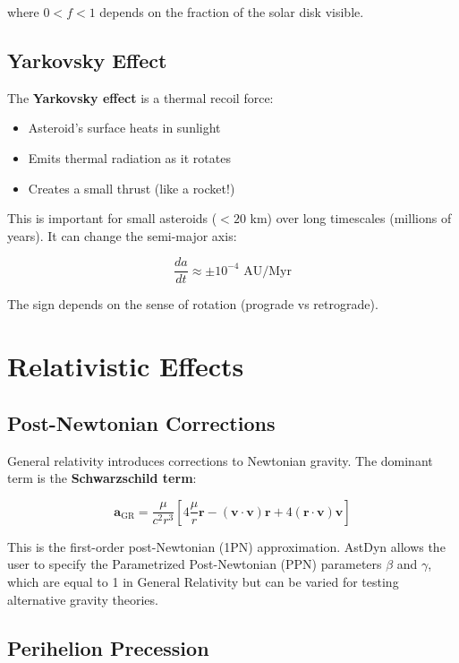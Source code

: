 where $0 < f < 1$ depends on the fraction of the solar disk visible.

\subsection{Yarkovsky Effect}

The \textbf{Yarkovsky effect} is a thermal recoil force:
\begin{itemize}
    \item Asteroid's surface heats in sunlight
    \item Emits thermal radiation as it rotates
    \item Creates a small thrust (like a rocket!)
\end{itemize}

This is important for small asteroids ($< 20$ km) over long timescales (millions of years). It can change the semi-major axis:

\begin{equation}
    \frac{da}{dt} \approx \pm 10^{-4} \text{ AU/Myr}
\end{equation}

The sign depends on the sense of rotation (prograde vs retrograde).

\section{Relativistic Effects}

\subsection{Post-Newtonian Corrections}

General relativity introduces corrections to Newtonian gravity. The dominant term is the \textbf{Schwarzschild term}:

\begin{equation}
    \mathbf{a}_{\text{GR}} = \frac{\mu}{c^2 r^3}\left[4\frac{\mu}{r}\mathbf{r} - (\mathbf{v} \cdot \mathbf{v})\mathbf{r} + 4(\mathbf{r} \cdot \mathbf{v})\mathbf{v}\right]
\end{equation}

This is the first-order post-Newtonian (1PN) approximation. AstDyn allows the user to specify the Parametrized Post-Newtonian (PPN) parameters $\beta$ and $\gamma$, which are equal to 1 in General Relativity but can be varied for testing alternative gravity theories.

\subsection{Perihelion Precession}

